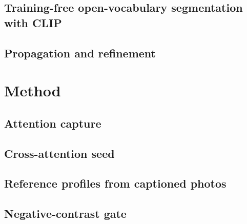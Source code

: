\documentclass[runningheads]{llncs}
\newcommand{\figbox}[2]{\fbox{\parbox[c][#2][c]{0.95\linewidth}{\centering\small\textcolor{gray}{#1}}}}
\begin{document}
\subsection{Training-free open-vocabulary segmentation with CLIP}

\subsection{Propagation and refinement}

\section{Method}
\label{sec:method}

\begin{figure}[t]
\centering
\figbox{Method overview: one noising pass; cross-attention seed; reference profiles from captioned photos; per-module negative-contrast gates; low-resolution consensus; fine self-attention propagation; threshold.}{4cm}
\caption{}
\label{fig:method}
\end{figure}

\subsection{Attention capture}
\label{sec:capture}

\subsection{Cross-attention seed}
\label{sec:seed}

\subsection{Reference profiles from captioned photos}
\label{sec:profiles}

\subsection{Negative-contrast gate}
\label{sec:gate}
\end{document}
